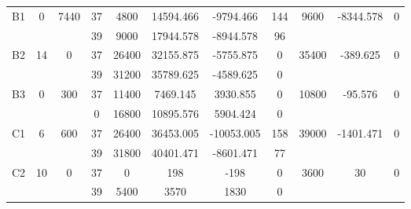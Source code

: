 \begin{sidewaystable}
\begin{tabular}{c||c|c||c|c|c|c|c||c|c|c}
        
      \\
      \hline
      \multirow{2}{*}{B1} &
      \multirow{2}{*}{0} &
      \multirow{2}{*}{7440} &
      37 &
      4800 &
        14594.466 &
        -9794.466 &
        144 &
      \multirow{2}{*}{9600} &
        \multirow{2}{*}{-8344.578} &
        \multirow{2}{*}{0}
      \\
      \cline{4-8}
       &
       &
       &
      39 &
      9000 &
        17944.578 &
        -8944.578 &
        96 &
      
         &
        
      \\
      \hline
      \multirow{2}{*}{B2} &
      \multirow{2}{*}{14} &
      \multirow{2}{*}{0} &
      37 &
      26400 &
        32155.875 &
        -5755.875 &
        0 &
      \multirow{2}{*}{35400} &
        \multirow{2}{*}{-389.625} &
        \multirow{2}{*}{0}
      \\
      \cline{4-8}
       &
       &
       &
      39 &
      31200 &
        35789.625 &
        -4589.625 &
        0 &
      
         &
        
      \\
      \hline
      \multirow{2}{*}{B3} &
      \multirow{2}{*}{0} &
      \multirow{2}{*}{300} &
      37 &
      11400 &
        7469.145 &
        3930.855 &
        0 &
      \multirow{2}{*}{10800} &
        \multirow{2}{*}{-95.576} &
        \multirow{2}{*}{0}
      \\
      \cline{4-8}
       &
       &
       &
      0 &
      16800 &
        10895.576 &
        5904.424 &
        0 &
      
         &
        
      \\
      \hline
      \multirow{2}{*}{C1} &
      \multirow{2}{*}{6} &
      \multirow{2}{*}{600} &
      37 &
      26400 &
        36453.005 &
        -10053.005 &
        158 &
      \multirow{2}{*}{39000} &
        \multirow{2}{*}{-1401.471} &
        \multirow{2}{*}{0}
      \\
      \cline{4-8}
       &
       &
       &
      39 &
      31800 &
        40401.471 &
        -8601.471 &
        77 &
      
         &
        
      \\
      \hline
      \multirow{2}{*}{C2} &
      \multirow{2}{*}{10} &
      \multirow{2}{*}{0} &
      37 &
      0 &
        198 &
        -198 &
        0 &
      \multirow{2}{*}{3600} &
        \multirow{2}{*}{30} &
        \multirow{2}{*}{0}
      \\
      \cline{4-8}
       &
       &
       &
      39 &
      5400 &
        3570 &
        1830 &
        0 &
      

\end{tabular}
\end{sidewaystable}
